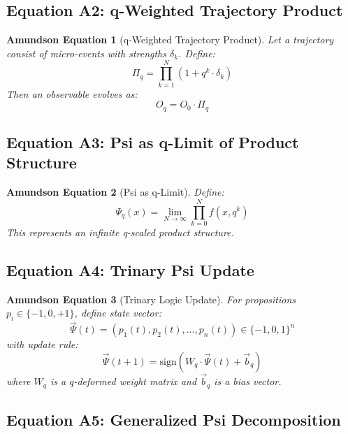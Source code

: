 \documentclass[12pt,a4paper]{article}
\newtheorem{equation_amundson}{Amundson Equation}
\begin{document}
\subsection{Equation A2: q-Weighted Trajectory Product}

\begin{equation_amundson}[q-Weighted Trajectory Product]
Let a trajectory consist of micro-events with strengths $\delta_k$. Define:
\begin{equation}\label{eq:a2}
\Pi_q = \prod_{k=1}^{N} (1 + q^k \cdot \delta_k)
\end{equation}
Then an observable evolves as:
\begin{equation}
O_q = O_0 \cdot \Pi_q
\end{equation}
\end{equation_amundson}

\subsection{Equation A3: Psi as q-Limit of Product Structure}

\begin{equation_amundson}[Psi as q-Limit]
Define:
\begin{equation}\label{eq:a3}
\Psi_q(x) = \lim_{N \to \infty} \prod_{k=0}^{N} f(x, q^k)
\end{equation}
This represents an infinite q-scaled product structure.
\end{equation_amundson}

\subsection{Equation A4: Trinary Psi Update}

\begin{equation_amundson}[Trinary Logic Update]
For propositions $p_i \in \{-1, 0, +1\}$, define state vector:
\begin{equation}
\vec{\Psi}(t) = (p_1(t), p_2(t), \ldots, p_n(t)) \in \{-1,0,1\}^n
\end{equation}
with update rule:
\begin{equation}\label{eq:a4}
\vec{\Psi}(t+1) = \text{sign}\left( W_q \cdot \vec{\Psi}(t) + \vec{b}_q \right)
\end{equation}
where $W_q$ is a $q$-deformed weight matrix and $\vec{b}_q$ is a bias vector.
\end{equation_amundson}

\subsection{Equation A5: Generalized Psi Decomposition}
\end{document}
